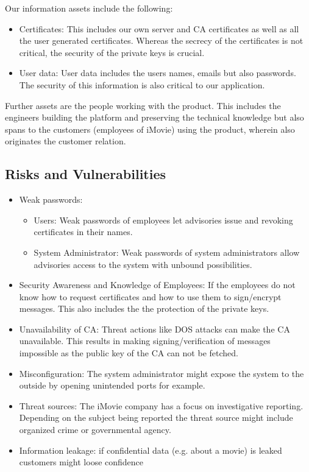 \documentclass[english]{article}
\begin{document}
Our information assets include the following:

\begin{itemize}
	\item Certificates: This includes our own server and CA certificates as well as all the user generated certificates. Whereas the secrecy of the certificates is not critical, the security of the private keys is crucial. 
	\item User data: User data includes the users names, emails but also passwords. The security of this information is also critical to our application.
\end{itemize}

Further assets are the people working with the product. This includes the engineers building the platform and preserving the technical knowledge but also spans to the customers (employees of iMovie) using the product, wherein also originates the customer relation.   

\subsection{Risks and Vulnerabilities}

\begin{itemize}
    \item Weak passwords: 
    \begin{itemize}
        \item Users: Weak passwords of employees let advisories issue and revoking certificates in their names.
        \item System Administrator: Weak passwords of system administrators allow advisories access to the system with unbound possibilities.
    \end{itemize}
    \item Security Awareness and Knowledge of Employees: If the employees do not know how to request certificates and how to use them to sign/encrypt messages. This also includes the the protection of the private keys.
    \item Unavailability of CA: Threat actions like DOS attacks can make the CA unavailable. This results in making signing/verification of messages impossible as the public key of the CA can not be fetched. 
    \item Misconfiguration: The system administrator might expose the system to the outside by opening unintended ports for example.
    \item Threat sources: The iMovie company has a focus on investigative reporting. Depending on the subject being reported the threat source might include organized crime or governmental agency. 
    \item Information leakage: if confidential data (e.g. about a movie) is leaked customers might loose confidence
\end{itemize}
\end{document}
